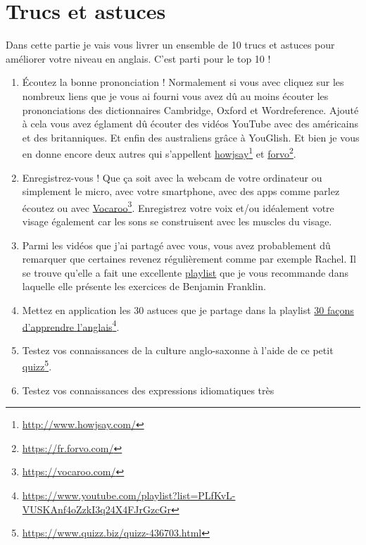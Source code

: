 \chapter{Trucs et astuces}

Dans cette partie je vais vous livrer un ensemble de 10 trucs et astuces
pour améliorer votre niveau en anglais. C'est parti pour le top 10 !

\begin{enumerate}
  \item \'Ecoutez la bonne prononciation ! Normalement si vous avec
  cliquez sur les nombreux liens que je vous ai fourni vous avez dû au
  moins écouter les prononciations des dictionnaires Cambridge, Oxford
  et Wordreference. Ajouté à cela vous avez églament dû écouter des
  vidéos YouTube avec des américains et des britanniques. Et enfin des
  australiens grâce à YouGlish. Et bien je vous en donne encore deux autres qui
  s'appellent \href{http://www.howjsay.com/}{howjsay}\footnote{\url{http://www.howjsay.com/}}
  et \href{https://fr.forvo.com/}{forvo}\footnote{\url{https://fr.forvo.com/}}.
  \item Enregistrez-vous ! Que ça soit avec la webcam de votre
  ordinateur ou simplement le micro, avec votre smartphone, avec des
  apps comme parlez écoutez ou avec
  \href{https://vocaroo.com/}{Vocaroo}\footnote{\url{https://vocaroo.com/}}.
  Enregistrez votre voix et/ou idéalement votre visage également car
  les sons se construisent avec les muscles du visage.
  \item Parmi les vidéos que j'ai partagé avec vous, vous avez
    probablement dû remarquer que certaines revenez régulièrement
    comme par exemple Rachel. Il se trouve qu'elle a fait une
    excellente
    \href{https://www.youtube.com/playlist?list=PL27A5D7DE7D02373A}{playlist}
    que je vous recommande dans laquelle elle présente les exercices
    de Benjamin Franklin.
  \item Mettez en application les 30 astuces que je partage dans la
    playlist \href{https://www.youtube.com/playlist?list=PLfKvL-VUSKAnf4oZzkI3q24X4FJrGzcGr}{30 façons d'apprendre l'anglais}\footnote{\url{https://www.youtube.com/playlist?list=PLfKvL-VUSKAnf4oZzkI3q24X4FJrGzcGr}}.
  \item Testez vos connaissances de la culture anglo-saxonne à l'aide
    de ce petit \href{https://www.quizz.biz/quizz-436703.html}{quizz}\footnote{\url{https://www.quizz.biz/quizz-436703.html}}.
  \item Testez vos connaissances des expressions idiomatiques très

\end{enumerate}
